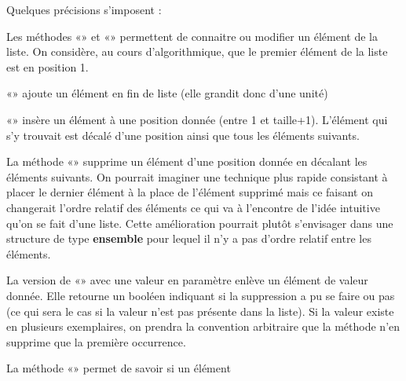 Quelques précisions s’imposent :
\begin{liste}
	\item 
		Les méthodes «» et «»
		permettent de connaitre ou modifier un élément de la liste. On
		considère, au cours d'algorithmique, que le premier élément de 
		la liste est en position 1.
	\item 
		«» ajoute un élément en fin de liste (elle
		grandit donc d’une unité)
	\item 
		«» insère un élément à une position donnée
		(entre 1 et taille+1). L’élément qui s’y trouvait est décalé
		d'une position ainsi que tous les éléments suivants.
	\item 
		La méthode «»
		supprime un élément d'une position donnée en
		décalant les éléments suivants. On pourrait imaginer une technique plus
		rapide consistant à placer le dernier élément à la place de l’élément
		supprimé mais ce faisant on changerait l’ordre relatif des éléments ce
		qui va à l’encontre de l’idée intuitive qu’on se fait d’une liste.
		Cette amélioration pourrait plutôt s’envisager dans une structure de
		type \textbf{ensemble} pour lequel il n’y a pas d’ordre relatif entre
		les éléments.
	\item 
		La version de «» avec une valeur en
		paramètre enlève un élément de valeur donnée. Elle retourne un booléen
		indiquant si la suppression a pu se faire ou pas (ce qui sera le cas si
		la valeur n’est pas présente dans la liste). Si la valeur existe en
		plusieurs exemplaires, on prendra la convention arbitraire que
		la méthode n’en supprime que la première	occurrence.
	\item 
		La méthode «» permet de savoir si un élément

\end{liste}
